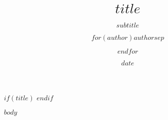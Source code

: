 \documentclass[10pt, compress]{beamer}
\title{$title$}
\subtitle{$subtitle$}
\author{$for(author)$$author$$sep$ \and $endfor$}
\date{$date$}
\institute{$institute$}
\begin{document}
$if(title)$
\frame{\titlepage}
$endif$

$body$
\end{document}
